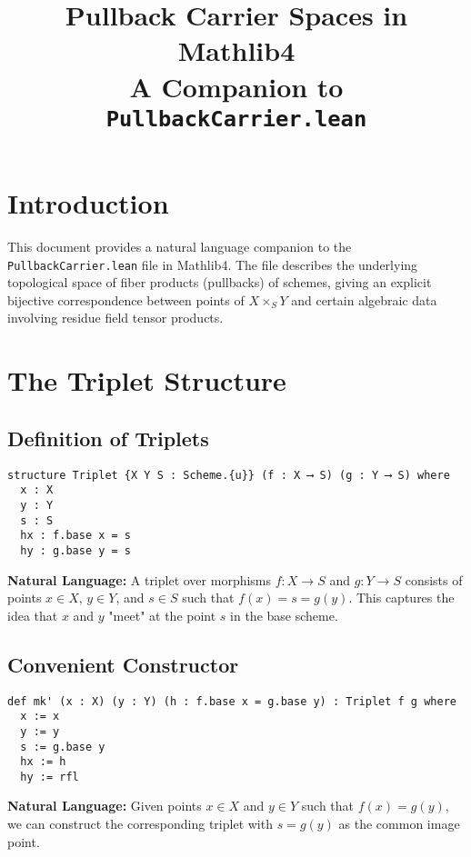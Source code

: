 \documentclass{article}
\title{Pullback Carrier Spaces in Mathlib4\\
\large A Companion to \texttt{PullbackCarrier.lean}}
\author{}
\date{}
\theoremstyle{definition}
\begin{document}
\maketitle

\section{Introduction}

This document provides a natural language companion to the \texttt{PullbackCarrier.lean} file in Mathlib4. The file describes the underlying topological space of fiber products (pullbacks) of schemes, giving an explicit bijective correspondence between points of $X \times_S Y$ and certain algebraic data involving residue field tensor products.

\section{The Triplet Structure}

\subsection{Definition of Triplets}

\begin{lstlisting}
structure Triplet {X Y S : Scheme.{u}} (f : X ⟶ S) (g : Y ⟶ S) where
  x : X
  y : Y
  s : S
  hx : f.base x = s
  hy : g.base y = s
\end{lstlisting}

\textbf{Natural Language:} A triplet over morphisms $f: X \to S$ and $g: Y \to S$ consists of points $x \in X$, $y \in Y$, and $s \in S$ such that $f(x) = s = g(y)$. This captures the idea that $x$ and $y$ "meet" at the point $s$ in the base scheme.

\subsection{Convenient Constructor}

\begin{lstlisting}
def mk' (x : X) (y : Y) (h : f.base x = g.base y) : Triplet f g where
  x := x
  y := y
  s := g.base y
  hx := h
  hy := rfl
\end{lstlisting}

\textbf{Natural Language:} Given points $x \in X$ and $y \in Y$ such that $f(x) = g(y)$, we can construct the corresponding triplet with $s = g(y)$ as the common image point.
\end{document}
